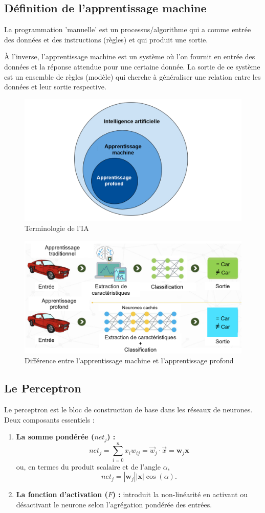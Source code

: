 \documentclass{article}
\begin{document}
\subsection{Définition de l’apprentissage machine}
La programmation 'manuelle' est un processus/algorithme qui a comme entrée des données et des instructions (règles) et qui produit une sortie.

À l'inverse, l'apprentissage machine est un système où l'on fournit en entrée des données et la réponse attendue pour une certaine donnée. La sortie de ce système est un ensemble de règles (modèle) qui cherche à généraliser une relation entre les données et leur sortie respective.

\begin{figure}[ht]
    \centering
    \includegraphics[width=0.5\linewidth]{graphics/ai_terms.PNG}
    \caption{Terminologie de l'IA}
    \label{fig:ai-terms}
\end{figure}

\begin{figure}[ht]
    \centering
    \includegraphics[width=0.7\linewidth]{graphics/ml_vs_dl.PNG}
    \caption{Différence entre l'apprentissage machine et l'apprentissage profond}
    \label{fig:ai-terms-dl}
\end{figure}

\subsection{Le Perceptron}
Le perceptron est le bloc de construction de base dans les réseaux de neurones. Deux composants essentiels :
\begin{enumerate}
    \item \textbf{La somme pondérée (\(net_j\)) :}
    \[
    net_j = \sum_{i=0}^{n} x_i w_{ij} = \vec{w}_j \cdot \vec{x} = \mathbf{w}_j \mathbf{x}
    \]
    ou, en termes du produit scalaire et de l’angle \(\alpha\),
    \[
    net_j = |\mathbf{w}_j| |\mathbf{x}| \cos(\alpha).
    \]
    
    \item \textbf{La fonction d'activation (\(F\)) :} introduit la non-linéarité en activant ou désactivant le neurone selon l’agrégation pondérée des entrées.
\end{enumerate}
\end{document}
